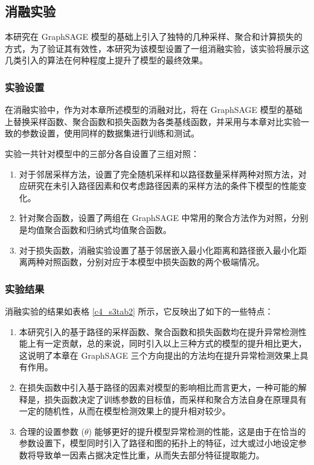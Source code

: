 \subsection{消融实验}

本研究在 GraphSAGE 模型的基础上引入了独特的几种采样、聚合和计算损失的方式，为了验证其有效性，本研究为该模型设置了一组消融实验，该实验将展示这几类引入的算法在何种程度上提升了模型的最终效果。

\subsubsection{实验设置}

在消融实验中，作为对本章所述模型的消融对比，将在 GraphSAGE 模型的基础上替换采样函数、聚合函数和损失函数为各类基线函数，并采用与本章对比实验一致的参数设置，使用同样的数据集进行训练和测试。

实验一共针对模型中的三部分各自设置了三组对照：

\begin{enumerate}
    \item 对于邻居采样方法，设置了完全随机采样和以路径数量采样两种对照方法，对应研究在未引入路径因素和仅考虑路径因素的采样方法的条件下模型的性能变化。
    \item 针对聚合函数，设置了两组在 GraphSAGE 中常用的聚合方法作为对照，分别是均值聚合函数和归纳式均值聚合函数。
    \item 对于损失函数，消融实验设置了基于邻居嵌入最小化距离和路径嵌入最小化距离两种对照函数，分别对应于本模型中损失函数的两个极端情况。
\end{enumerate}

\subsubsection{实验结果}

消融实验的结果如表格 \ref{c4_s3tab2} 所示，它反映出了如下的一些特点：

\begin{enumerate}
    \item 本研究引入的基于路径的采样函数、聚合函数和损失函数均在提升异常检测性能上有一定贡献，总的来说，同时引入以上三种方式的模型的提升相比更大，这说明了本章在 GraphSAGE 三个方向提出的方法均在提升异常检测效果上具有作用。
    \item 在损失函数中引入基于路径的因素对模型的影响相比而言更大，一种可能的解释是，损失函数决定了训练参数的目标值，而采样和聚合方法自身在原理具有一定的随机性，从而在模型检测效果上的提升相对较少。
    \item 合理的设置参数 ($\theta$) 能够更好的提升模型异常检测的性能，这是由于在恰当的参数设置下，模型同时引入了路径和图的拓扑上的特征，过大或过小地设定参数将导致单一因素占据决定性比重，从而失去部分特征提取能力。
\end{enumerate}

